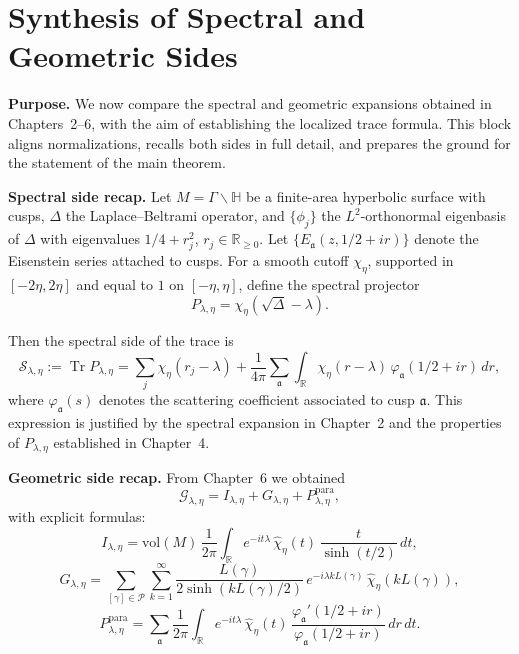 \bigskip


\section{Synthesis of Spectral and Geometric Sides}

\noindent\textbf{Purpose.}
We now compare the spectral and geometric expansions obtained in Chapters~2--6,
with the aim of establishing the localized trace formula.
This block aligns normalizations, recalls both sides in full detail,
and prepares the ground for the statement of the main theorem.

\medskip

\noindent\textbf{Spectral side recap.}
Let $M = \Gamma\backslash\mathbb{H}$ be a finite-area hyperbolic surface with
cusps, $\Delta$ the Laplace--Beltrami operator, and $\{\phi_j\}$ the
$L^2$-orthonormal eigenbasis of $\Delta$ with eigenvalues $1/4 + r_j^2$,
$r_j \in \mathbb{R}_{\ge 0}$.
Let $\{E_\mathfrak{a}(z,1/2+ir)\}$ denote the Eisenstein series attached to
cusps.
For a smooth cutoff $\chi_\eta$, supported in $[-2\eta,2\eta]$ and equal to $1$
on $[-\eta,\eta]$, define the spectral projector
\[
  P_{\lambda,\eta} = \chi_\eta(\sqrt{\Delta} - \lambda).
\]

Then the spectral side of the trace is
\[
  \mathcal{S}_{\lambda,\eta}
  := \operatorname{Tr} P_{\lambda,\eta}
  = \sum_{j} \chi_\eta(r_j - \lambda)
  + \frac{1}{4\pi}\sum_{\mathfrak{a}} \int_{\mathbb{R}}
    \chi_\eta(r - \lambda)\,\varphi_\mathfrak{a}(1/2+ir)\, dr,
\]
where $\varphi_\mathfrak{a}(s)$ denotes the scattering coefficient associated to
cusp $\mathfrak{a}$.
This expression is justified by the spectral expansion in Chapter~2 and the
properties of $P_{\lambda,\eta}$ established in Chapter~4.

\medskip

\noindent\textbf{Geometric side recap.}
From Chapter~6 we obtained
\[
  \mathcal{G}_{\lambda,\eta}
  = I_{\lambda,\eta} + G_{\lambda,\eta} + P_{\lambda,\eta}^{\mathrm{para}},
\]
with explicit formulas:
\[
  I_{\lambda,\eta}
  = \mathrm{vol}(M)\, \frac{1}{2\pi}\int_{\mathbb{R}}
    e^{-it\lambda}\,\widehat{\chi}_\eta(t)\,
    \frac{t}{\sinh(t/2)}\, dt,
\]
\[
  G_{\lambda,\eta}
  = \sum_{[\gamma]\in \mathcal{P}}\sum_{k=1}^\infty
    \frac{L(\gamma)}{2\sinh(kL(\gamma)/2)}\,
    e^{-i\lambda kL(\gamma)}\, \widehat{\chi}_\eta(kL(\gamma)),
\]
\[
  P_{\lambda,\eta}^{\mathrm{para}}
  = \sum_{\mathfrak{a}} \frac{1}{2\pi}\int_{\mathbb{R}}
    e^{-it\lambda}\,\widehat{\chi}_\eta(t)\,
    \frac{\varphi_\mathfrak{a}'(1/2+ir)}{\varphi_\mathfrak{a}(1/2+ir)}\, dr\, dt.
\]

